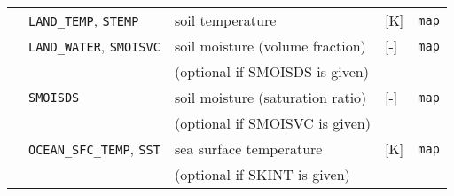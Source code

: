 {\begin{table}[bth]
\begin{center}
\begin{tabularx}{150mm}{rl|l|l|X}
           &\verb|LAND_TEMP|, \verb|STEMP| & soil temperature                 & [K]            & \verb|map|         \\
           &\verb|LAND_WATER|, \verb|SMOISVC| & soil moisture (volume fraction)  & [-]            & \verb|map|         \\
           &               & (optional if SMOISDS is given)   &                &                    \\
           &\verb|SMOISDS| & soil moisture (saturation ratio) & [-]            & \verb|map|         \\
           &               & (optional if SMOISVC is given)   &                &                    \\
           &\verb|OCEAN_SFC_TEMP|, \verb|SST|     & sea surface temperature          & [K]            & \verb|map|         \\
           &               & (optional if SKINT is given)     &                &                    \\\hline
\end{tabularx}
\end{center}
\end{table}
}
